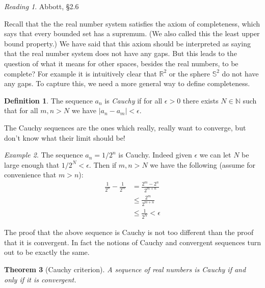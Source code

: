 \documentclass[11pt,oneside]{amsbook}
\newcommand{\NN}{\mathbb N}
\newcommand{\RR}{\mathbb R}
\theoremstyle{definition}
\theoremstyle{plain}
\newtheorem{thm}{Theorem}[section]
\theoremstyle{definition}
\newtheorem{defn}[thm]{Definition}
\theoremstyle{remark}
\newtheorem{example}[thm]{Example}
\newtheorem*{reading}{Reading}
\numberwithin{equation}{section}
\numberwithin{figure}{section}
\begin{document}
\begin{reading}
  Abbott, \S 2.6
\end{reading}

Recall that the the real number system satisfies the axiom of completeness, which says that every bounded set has a supremum. (We also called this the least upper bound property.) We have said that this axiom should be interpreted as saying that the real number system does not have any gaps. But this leads to the question of what it means for other spaces, besides the real numbers, to be complete? For example it is intuitively clear that $\RR^2$ or the sphere $\mathbb S^2$ do not have any gaps. To capture this, we need a more general way to define completeness.

\begin{defn}
  The sequence $a_n$ is \emph{Cauchy} if for all $\epsilon>0$ there exists $N\in\NN$ such that for all $m,n>N$ we have $|a_n-a_m|<\epsilon$.
\end{defn}

The Cauchy sequences are the ones which really, really want to converge, but don't know what their limit should be!

\begin{example}
  The sequence $a_n=1/2^n$ is Cauchy. Indeed given $\epsilon$ we can let $N$ be large enough that $1/2^N<\epsilon$. Then if $m,n>N$ we have the following (assume for convenience that $m>n$):
  \begin{align*}
    \frac1{2^n}-\frac1{2^m}&=\frac{2^m-2^n}{2^{m+n}}\\
    &\leq\frac{2^m}{2^{m+n}}\\
    &\leq\frac1{2^N}<\epsilon
  \end{align*}
\end{example}

The proof that the above sequence is Cauchy is not too different than the proof that it is convergent. In fact the notions of Cauchy and convergent sequences turn out to be exactly the same.

\begin{thm}[Cauchy criterion]
  A sequence of real numbers is Cauchy if and only if it is convergent.
\end{thm}
\end{document}
